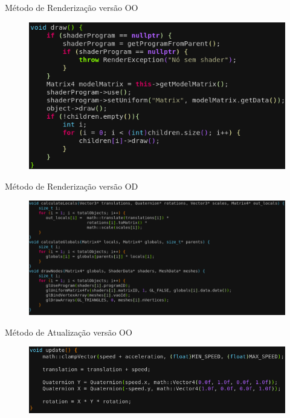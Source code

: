 \documentclass{beamer}
\begin{document}
\begin{frame}[t]{Método de Renderização versão OO}
    \begin{figure}[h!]
        \centering
        \includegraphics[width =.8\textwidth]{figuras/ooddraw}
        \par\medskip
    \end{figure}
\end{frame}

\begin{frame}{Método de Renderização versão OD}
    \begin{figure}[h!]
        \centering
        \includegraphics[width =\textwidth]{figuras/doddraw}
        \par\medskip
    \end{figure}
\end{frame}

\begin{frame}{Método de Atualização versão OO}
    \begin{figure}[h!]
        \centering
        \includegraphics[width =\textwidth]{figuras/oodupdate}
        \par\medskip
    \end{figure}
\end{frame}
\end{document}
